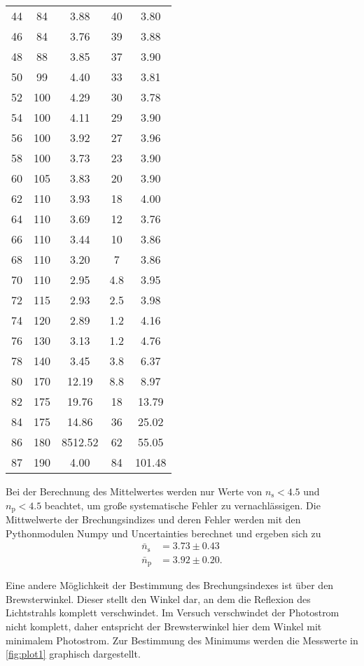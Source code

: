 \begin{longtable}{S[table-format=2.0] S[table-format=3.0] S[table-format=4.2]S[table-format=2.1]S[table-format=3.2]}
    44 & 84  &  3.88    & 40 & 3.80 \\
    46 & 84  &  3.76    & 39 & 3.88 \\
    48 & 88  &  3.85    & 37 & 3.90 \\
    50 & 99  &  4.40    & 33 & 3.81 \\
    52 & 100 &  4.29    & 30 & 3.78\\
    54 & 100 &  4.11    & 29 & 3.90 \\
    56 & 100 &  3.92    & 27 & 3.96 \\
    58 & 100 &  3.73    & 23 & 3.90 \\
    60 & 105 &  3.83    & 20 & 3.90 \\
    62 & 110 &  3.93    & 18 & 4.00 \\
    64 & 110 &  3.69    & 12 & 3.76 \\
    66 & 110 &  3.44    & 10 & 3.86 \\
    68 & 110 &  3.20    &  7 & 3.86 \\
    70 & 110 &  2.95    &  4.8 & 3.95 \\
    72 & 115 &  2.93    &  2.5 & 3.98 \\
    74 & 120 &  2.89    &  1.2 & 4.16 \\
    76 & 130 &  3.13    &  1.2 & 4.76 \\
    78 & 140 &  3.45    &  3.8 & 6.37 \\
    80 & 170 &  12.19   &  8.8 & 8.97 \\
    82 & 175 &  19.76   & 18 & 13.79 \\
    84 & 175 &  14.86   & 36 & 25.02 \\
    86 & 180 &  8512.52 & 62 & 55.05 \\
    87 & 190 &  4.00    & 84 & 101.48 \\
   \bottomrule 
\end{longtable}


Bei der Berechnung des Mittelwertes werden nur Werte von $n_{\text{s}}<4.5$ und $n_{\text{p}}<4.5$
beachtet, um große systematische Fehler zu vernachlässigen.
Die Mittwelwerte der Brechungsindizes und deren Fehler werden mit den Pythonmodulen Numpy \cite{numpy} und Uncertainties \cite{uncertainties} berechnet
und ergeben sich zu
\begin{align*}
  \bar{n}_{\text{s}}&=3.73 \pm 0.43 \\
  \bar{n}_{\text{p}}&=3.92 \pm 0.20.
\end{align*}

Eine andere Möglichkeit der Bestimmung des Brechungsindexes ist über den Brewsterwinkel.
Dieser stellt den Winkel dar, an dem die Reflexion des Lichtstrahls komplett verschwindet.
Im Versuch verschwindet der Photostrom nicht komplett, daher entspricht der Brewsterwinkel hier dem Winkel mit minimalem Photostrom.
Zur Bestimmung des Minimums werden die Messwerte in \autoref{fig:plot1} graphisch dargestellt.

